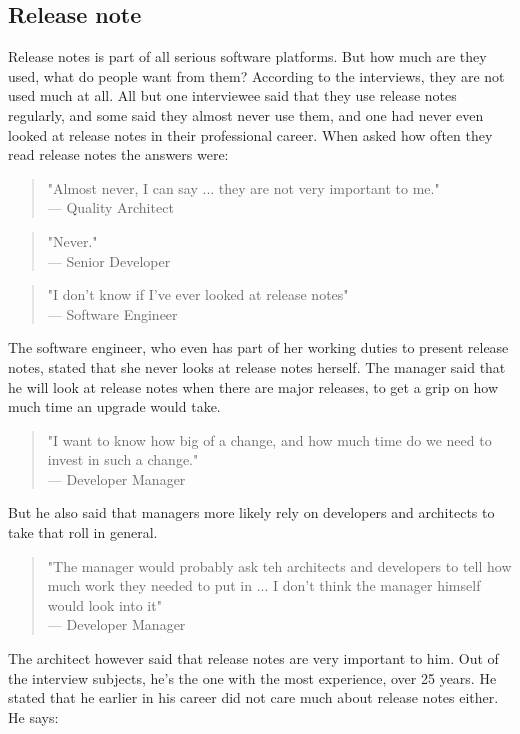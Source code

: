 \documentclass{cslthse-msc}
\begin{document}
    \subsection{Release note}
    Release notes is part of all serious software platforms. But how much are they used, what do people want from them? According to the interviews, they are not used much at all. All but one interviewee said that they use release notes regularly, and some said they almost never use them, and one had never even looked at release notes in their professional career. When asked how often they read release notes the answers were:
    \begin{quote}
        "Almost never, I can say ... they are not very important to me."\\
        --- Quality Architect
    \end{quote}
    \begin{quote}
        "Never." \\
        --- Senior Developer
    \end{quote}
    \begin{quote}
        "I don't know if I've ever looked at release notes" \\
        --- Software Engineer
    \end{quote}
    The software engineer, who even has part of her working duties to present release notes, stated that she never looks at release notes herself.
    The manager said that he will look at release notes when there are major releases, to get a grip on how much time an upgrade would take.
    \begin{quote}
        "I want to know how big of a change, and how much time do we need to invest in such a change."\\
        --- Developer Manager
    \end{quote}
    But he also said that managers more likely rely on developers and architects to take that roll in general.
    \begin{quote}
        "The manager would probably ask teh architects and developers to tell how much work they needed to put in ... I don't think the manager himself would look into it"\\
        --- Developer Manager
    \end{quote}
    The architect however said that release notes are very important to him. Out of the interview subjects, he's the one with the most experience, over 25 years. He stated that he earlier in his career did not care much about release notes either. He says:
\end{document}
